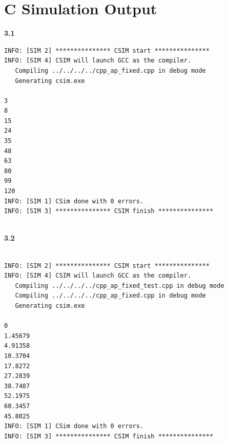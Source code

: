 \documentclass{article}
\begin{document}
\section{C Simulation Output}
\textbf{3.1}
\begin{lstlisting}
INFO: [SIM 2] *************** CSIM start ***************
INFO: [SIM 4] CSIM will launch GCC as the compiler.
   Compiling ../../../../cpp_ap_fixed.cpp in debug mode
   Generating csim.exe

3
8
15
24
35
48
63
80
99
120
INFO: [SIM 1] CSim done with 0 errors.
INFO: [SIM 3] *************** CSIM finish ***************


\end{lstlisting}
\vspace{2cm}
\textbf{3.2}
\begin{lstlisting}

INFO: [SIM 2] *************** CSIM start ***************
INFO: [SIM 4] CSIM will launch GCC as the compiler.
   Compiling ../../../../cpp_ap_fixed_test.cpp in debug mode
   Compiling ../../../../cpp_ap_fixed.cpp in debug mode
   Generating csim.exe

0
1.45679
4.91358
10.3704
17.8272
27.2839
38.7407
52.1975
60.3457
45.8025
INFO: [SIM 1] CSim done with 0 errors.
INFO: [SIM 3] *************** CSIM finish ***************

\end{lstlisting}
\vspace{10cm}
\end{document}
